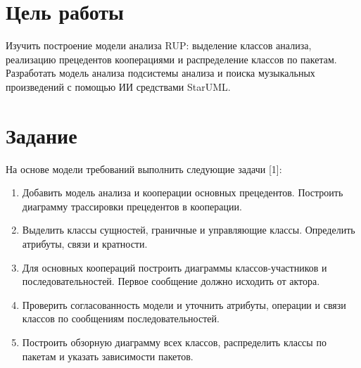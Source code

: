 \section{Цель работы}

Изучить построение модели анализа RUP: выделение классов анализа,
реализацию прецедентов кооперациями и распределение классов по пакетам.
Разработать модель анализа подсистемы анализа и поиска музыкальных
произведений с помощью ИИ средствами StarUML.

\section{Задание}

На основе модели требований выполнить следующие задачи [1]:
\begin{enumerate}
  \item Добавить модель анализа и кооперации основных прецедентов.
  Построить диаграмму трассировки прецедентов в кооперации.
  \item Выделить классы сущностей, граничные и управляющие классы.
  Определить атрибуты, связи и кратности.
  \item Для основных коопераций построить диаграммы классов-участников
  и последовательностей. Первое сообщение должно исходить от актора.
  \item Проверить согласованность модели и уточнить атрибуты,
  операции и связи классов по сообщениям последовательностей.
  \item Построить обзорную диаграмму всех классов, распределить классы
  по пакетам и указать зависимости пакетов.
\end{enumerate}

